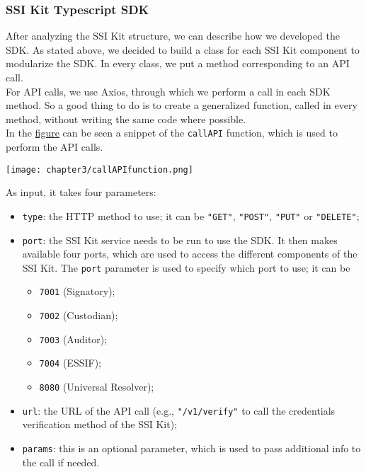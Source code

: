 \subsubsection{SSI Kit Typescript SDK}
After analyzing the SSI Kit structure, we can describe how we developed the SDK.
As stated above, we decided to build a class for each SSI Kit component to modularize 
the SDK. In every class, we put a method corresponding to an API call.\\
For API calls, we use Axios, through which we perform a call in each SDK method. So 
a good thing to do is to create a generalized function, called in every method, 
without writing the same code where possible.
\vspace{0.3cm}\\
In the \hyperref[fig:callAPI]{figure} can be seen a snippet of the \texttt{callAPI}
function, which is used to perform the API calls.
\begin{center}
    \texttt{[image: chapter3/callAPIfunction.png]}
    \vspace{-0.3cm}
    \label{fig:callAPI}
\end{center}
\vspace{0.3cm}
As input, it takes four parameters:
\begin{itemize}
    \item \texttt{type}: the HTTP method to use; it can be \texttt{"GET"}, \texttt{"POST"},
    \texttt{"PUT"} or \texttt{"DELETE"};
    \item \texttt{port}: the SSI Kit service needs to be run to use the SDK. It then makes
    available four ports, which are used to access the different components of the
    SSI Kit. The \texttt{port} parameter is used to specify which port to use; it can
    be 
    \begin{itemize}
        \item \texttt{7001} (Signatory);
        \item \texttt{7002} (Custodian);
        \item \texttt{7003} (Auditor);
        \item \texttt{7004} (ESSIF);
        \item \texttt{8080} (Universal Resolver);
    \end{itemize}
    \item \texttt{url}: the URL of the API call (e.g., \texttt{"/v1/verify"} to call
    the credentials verification method of the SSI Kit);
    \item \texttt{params}: this is an optional parameter, which is used to pass
    additional info to the call if needed.
\end{itemize}
